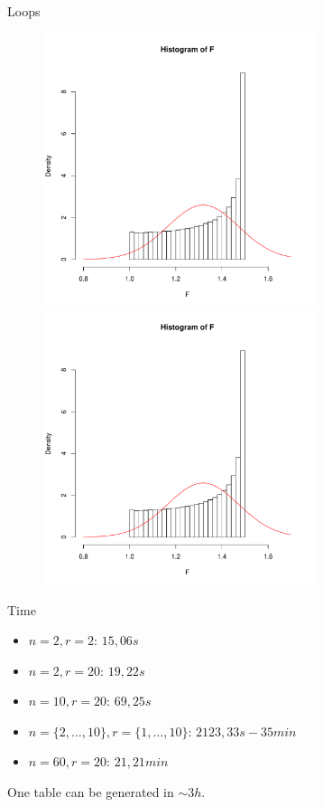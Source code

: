 \documentclass{beamer}
\begin{document}
\begin{frame}{Loops}
\begin{figure}
\begin{overprint}
\centerline{\includegraphics[width=8cm]{Primer_1e+6.pdf}}
\centerline{\includegraphics[width=8cm]{Primer_1e+7.pdf}}

\end{overprint}
\end{figure}

\end{frame}

\begin{frame}{Time}
\begin{itemize}
\item $n=2, r=2$: $15,06s$
\item $n=2, r=20$: $19,22s$
\item $n=10,r=20$: $69,25s$
\item $n=\{2,\dots,10\},  r=\{1, \dots,10\}$: $2123,33s -35min$
\item $n=60, r=20$: $21,21min$
\end{itemize}
One table can be generated in $\sim 3h.$
\end{frame}
\end{document}
